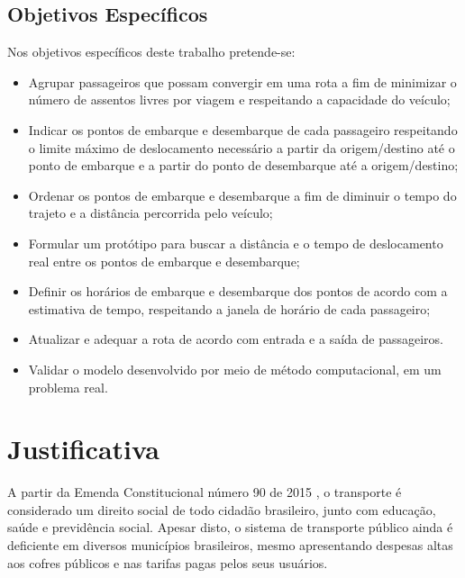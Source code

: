 \subsection{Objetivos Específicos}
Nos objetivos específicos deste trabalho pretende-se:
\begin{itemize}
    
    \item Agrupar passageiros que possam convergir em uma rota a fim de minimizar o número de assentos livres por viagem e respeitando a capacidade do veículo;
    
    \item Indicar os pontos de embarque e desembarque de cada passageiro respeitando o limite máximo de deslocamento necessário a partir da origem/destino até o ponto de embarque e a partir do ponto de desembarque até a origem/destino;
    
    \item Ordenar os pontos de embarque e desembarque a fim de diminuir o tempo do trajeto e a distância percorrida pelo veículo;
    
    \item Formular um protótipo para buscar a distância e o tempo de deslocamento real entre os pontos de embarque e desembarque;
    
    \item Definir os horários de embarque e desembarque dos pontos de acordo com a estimativa de tempo, respeitando a janela de horário de cada passageiro;
    
    \item Atualizar e adequar a rota de acordo com entrada e a saída de passageiros.
    
    \item Validar o modelo desenvolvido por meio de método computacional, em um problema real.
    
\end{itemize}

\section{Justificativa}
A partir da Emenda Constitucional número 90 de 2015 \cite{pec}, o transporte é considerado um direito social de todo cidadão brasileiro, junto com educação, saúde e previdência social. Apesar disto, o sistema de transporte público ainda é deficiente em diversos municípios brasileiros, mesmo apresentando despesas altas aos cofres públicos e nas tarifas pagas pelos seus usuários. 
 
